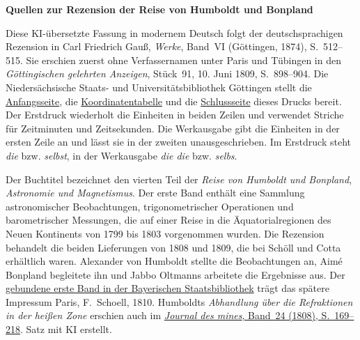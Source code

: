 \clearpage\thispagestyle{empty}
\begin{center}\textbf{Quellen zur Rezension der Reise von Humboldt und Bonpland}\end{center}
\noindent Diese KI-übersetzte Fassung in modernem Deutsch folgt der deutschsprachigen Rezension in Carl Friedrich Gauß, \emph{Werke}, Band~VI (Göttingen, 1874), S.~512–515. Sie erschien zuerst ohne Verfassernamen unter Paris und Tübingen in den \emph{Göttingischen gelehrten Anzeigen}, Stück~91, 10. Juni 1809, S.~898–904. Die Niedersächsische Staats- und Universitätsbibliothek Göttingen stellt die \href{https://images.p.sub.uni-goettingen.de/iiif/image/gdz:PPN319721507_1809:00000900/full/1750,/0/default.jpg}{Anfangsseite}, die \href{https://images.p.sub.uni-goettingen.de/iiif/image/gdz:PPN319721507_1809:00000903/full/1750,/0/default.jpg}{Koordinatentabelle} und die \href{https://images.p.sub.uni-goettingen.de/iiif/image/gdz:PPN319721507_1809:00000906/full/1750,/0/default.jpg}{Schlussseite} dieses Drucks bereit. Der Erstdruck wiederholt die Einheiten in beiden Zeilen und verwendet Striche für Zeitminuten und Zeitsekunden. Die Werkausgabe gibt die Einheiten in der ersten Zeile an und lässt sie in der zweiten unausgeschrieben. Im Erstdruck steht \emph{die} bzw. \emph{selbst}, in der Werkausgabe \emph{die die} bzw. \emph{selbs}.
\par\smallskip\noindent Der Buchtitel bezeichnet den vierten Teil der \emph{Reise von Humboldt und Bonpland}, \emph{Astronomie und Magnetismus}. Der erste Band enthält eine Sammlung astronomischer Beobachtungen, trigonometrischer Operationen und barometrischer Messungen, die auf einer Reise in die Äquatorialregionen des Neuen Kontinents von 1799 bis 1803 vorgenommen wurden. Die Rezension behandelt die beiden Lieferungen von 1808 und 1809, die bei Schöll und Cotta erhältlich waren. Alexander von Humboldt stellte die Beobachtungen an, Aimé Bonpland begleitete ihn und Jabbo Oltmanns arbeitete die Ergebnisse aus. Der \href{https://www.digitale-sammlungen.de/view/bsb10868686?page=9}{gebundene erste Band in der Bayerischen Staatsbibliothek} trägt das spätere Impressum Paris, F.~Schoell, 1810. Humboldts \emph{Abhandlung über die Refraktionen in der heißen Zone} erschien auch im \href{https://annales.minesparis.psl.eu/articles/1808-2/89-114.pdf}{\emph{Journal des mines}, Band~24 (1808), S.~169–218}. Satz mit KI erstellt.
\clearpage
